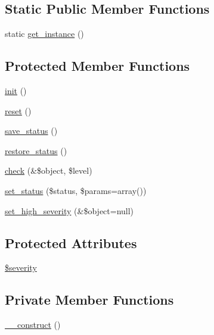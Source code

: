 \subsection*{Static Public Member Functions}
\begin{DoxyCompactItemize}
\item 
static \hyperlink{classDispatcher_af9998a41bc9dec229b58924e9d5e5e6a}{get\_\-instance} ()
\end{DoxyCompactItemize}
\subsection*{Protected Member Functions}
\begin{DoxyCompactItemize}
\item 
\hyperlink{class__OWL_ae0ef3ded56e8a6b34b6461e5a721cd3e}{init} ()
\item 
\hyperlink{class__OWL_a2f2a042bcf31965194c03033df0edc9b}{reset} ()
\item 
\hyperlink{class__OWL_a9e49b9c76fbc021b244c6915ea536d71}{save\_\-status} ()
\item 
\hyperlink{class__OWL_a465eeaf40edd9f9c848841700c32ce55}{restore\_\-status} ()
\item 
\hyperlink{class__OWL_ad6f4f6946f40199dd0333cf219fa500e}{check} (\&\$object, \$level)
\item 
\hyperlink{class__OWL_aea912d0ede9b3c2a69b79072d94d4787}{set\_\-status} (\$status, \$params=array())
\item 
\hyperlink{class__OWL_a576829692a3b66e3d518853bf43abae3}{set\_\-high\_\-severity} (\&\$object=null)
\end{DoxyCompactItemize}
\subsection*{Protected Attributes}
\begin{DoxyCompactItemize}
\item 
\hyperlink{class__OWL_ad26b40a9dbbacb33e299b17826f8327c}{\$severity}
\end{DoxyCompactItemize}
\subsection*{Private Member Functions}
\begin{DoxyCompactItemize}
\item 
\hyperlink{classDispatcher_a62ba56a9c99d2b25616023812d965c32}{\_\-\_\-construct} ()
\end{DoxyCompactItemize}
